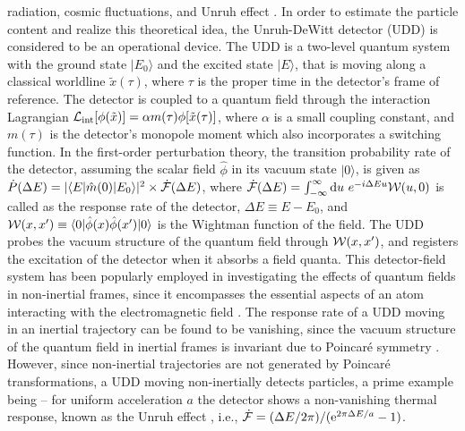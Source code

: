 \documentclass[aps,prl,nofootinbib,preprintnumbers,floatfix,twocolumn,superscriptaddress]{revtex4}
\def\d{{\rm d}}
\def\e{{\rm e}}
\begin{document}
radiation, cosmic fluctuations, and Unruh effect 
\cite{Hawking-1974, Davies-1975, Davies-1976, Unruh-1976}. 
In order to estimate the particle content and realize this theoretical
idea, the Unruh-DeWitt detector (UDD) \cite{Unruh-1976, DeWitt-1980} is considered to be an 
operational device.  The UDD is a two-level 
quantum system with the ground state $|E_0\rangle$ and the excited 
state $|E\rangle$, that is moving along a classical worldline  ${\tilde x}(\tau)$, 
where $\tau$ is the proper time in the detector's frame of reference. 
The detector is coupled 
to a quantum field through the interaction Lagrangian 
${\cal L}_{\rm int}[\phi({\tilde x})]=\alpha
m(\tau)\phi[{\tilde x}(\tau)]$, where $\alpha$ is a small coupling constant, 
and $m(\tau)$ is the detector's monopole moment \cite{Unruh-1976, DeWitt-1980} 
which also incorporates a switching function.
In the first-order perturbation theory, the transition probability rate of 
the detector, assuming the scalar field ${\hat \phi}$ 
in its vacuum state $|0\rangle$, is 
given as 
$ {\dot P}(\Delta E) 
 =|\langle E|{\hat m}(0)|E_0\rangle|^2 \times {\dot {\cal F}}(\Delta E)$,
where ${\dot {\cal F}}(\Delta E) =
\int_{-\infty}^{\infty} \d u ~ e^{-i\Delta E u} {\cal W}(u,0)$ is called as 
the response rate of the detector, $\Delta E\equiv E-E_0$, and 
${\cal W}(x,x')\equiv \langle 0|{\hat \phi}(x){\hat \phi}(x')|0\rangle$ is 
the Wightman function of the field. 
The UDD probes 
the vacuum structure of the quantum field through ${\cal W}(x,x')$, and registers 
the excitation of the detector when it absorbs a field quanta. This detector-field 
system has been popularly employed in investigating the effects of quantum fields 
in non-inertial frames, since it encompasses the essential aspects of an atom 
interacting with the electromagnetic field \cite{Martinez-2014}. The response rate 
of a UDD moving in an inertial trajectory can 
be found to be vanishing, since the vacuum structure of the quantum field 
in inertial frames is invariant due to Poincar\'{e} symmetry \cite{Matsas-2008}. 
However, since non-inertial trajectories are not generated by Poincar\'{e} 
transformations, a UDD moving non-inertially detects particles, 
a prime example being -- for uniform acceleration $a$ the detector shows a 
non-vanishing thermal response, known as the Unruh effect 
\cite{Unruh-1976, DeWitt-1980, Matsas-2008}, i.e., 
${\dot {\cal F}}=(\Delta E/2\pi)/(\e^{2\pi\Delta E/a}-1)$. 
\end{document}
